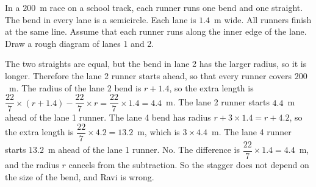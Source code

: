 \ques In a $200$~m race on a school track, each runner runs one bend and one straight. The bend in every lane is a semicircle. Each lane is $1.4$~m wide. All runners finish at the same line. Assume that each runner runs along the inner edge of the lane. Draw a rough diagram of lanes 1 and 2.\par
{}
\begin{answerblock}
 The two straights are equal, but the bend in lane 2 has the larger radius, so it is longer.\nl
Therefore the lane 2 runner starts ahead, so that every runner covers $200$~m.\nl
{} The radius of the lane 2 bend is $r+1.4$, so the extra length is $\dfrac{22}{7}\times(r+1.4)-\dfrac{22}{7}\times r=\dfrac{22}{7}\times1.4=4.4$~m.\nl
The lane 2 runner starts $4.4$~m ahead of the lane 1 runner.\nl
{} The lane 4 bend has radius $r+3\times1.4=r+4.2$, so the extra length is $\dfrac{22}{7}\times4.2=13.2$~m, which is $3\times4.4$~m.\nl
The lane 4 runner starts $13.2$~m ahead of the lane 1 runner.\nl
{} No. The difference is $\dfrac{22}{7}\times1.4=4.4$~m, and the radius $r$ cancels from the subtraction.\nl
So the stagger does not depend on the size of the bend, and Ravi is wrong.
\begin{center}
\end{center}
\end{answerblock}

